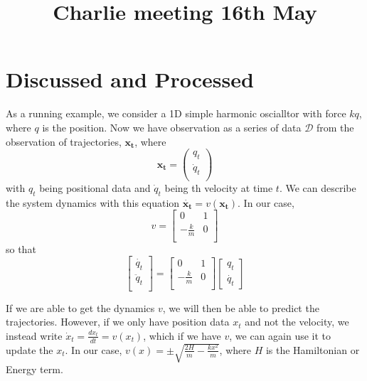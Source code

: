 \documentclass{article}
\title{\vspace{-3cm}Charlie meeting 16th May\vspace{-3em}}
\author{}
\date{}
\begin{document}
\maketitle
\section*{Discussed and Processed}
As a running example, we consider a 1D simple harmonic oscialltor with force $kq$, where $q$ is the position.
Now we have observation as a series of data $\mathcal{D}$ from the observation of trajectories, $\mathbf{x_t}$, where 
\begin{equation*}
 \mathbf{x_t} = 
 \begin{pmatrix}
  q_t \\
  \dot{q}_t \\
\end{pmatrix} 
\end{equation*}
with $q_t$ being positional data and $\dot{q}_t$ being th velocity at time $t$. 
We can describe the system dynamics with this equation $\mathbf{\dot{x_t}} = v(\mathbf{x_t})$.
In our case, 
\begin{equation*}
  v=
  \begin{bmatrix}
    0 & 1 \\
    -\frac{k}{m} & 0\\
  \end{bmatrix}
\end{equation*}
so that 
\begin{equation*}
  \begin{bmatrix}
    \dot{q_t} \\
    \ddot{q}_t\\
  \end{bmatrix}
  =
  \begin{bmatrix}
    0 & 1 \\
    -\frac{k}{m} & 0\\
  \end{bmatrix}
\begin{bmatrix}
  q_t \\
  \dot{q_t}
\end{bmatrix}
\end{equation*}

If we are able to get the dynamics $v$, we will then be able to predict the trajectories.
\newline
However, if we only have position data $x_t$ and not the velocity, we instead write $\dot{x}_t = \frac{d x_t}{d t} = v(x_t)$, which if we have $v$, we can again use it to update the $x_t$. 
In our case, $v(x)=\pm\sqrt{\frac{2H}{m}-\frac{kx^2}{m}}$, where $H$ is the Hamiltonian or Energy term. 
\end{document}

